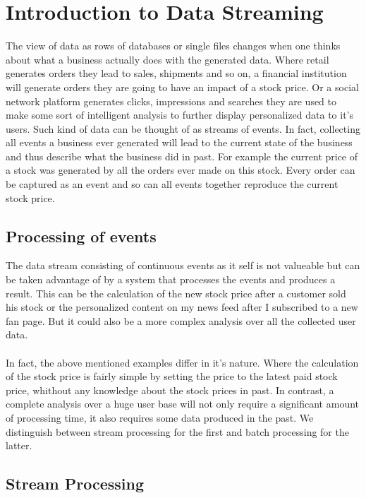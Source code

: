 \chapter{Introduction to Data Streaming}

The view of data as rows of databases or single files changes when one thinks
about what a business actually does with the generated data. Where retail
generates orders they lead to sales, shipments and so on, a financial institution will
generate orders they are going to have an impact of a stock price. Or a social
network platform generates clicks, impressions and searches they are used to
make some sort of intelligent analysis to further display personalized data to
it's users. Such kind of data can be thought of as streams of events. In fact,
collecting all events a business ever generated will lead to the current state
of the business and thus describe what the business did in past. For example the
current price of a stock was generated by all the orders ever made on this
stock. Every order can be captured as an event and so can all events together reproduce
the current stock price.

\section{Processing of events}

The data stream consisting of continuous events as it self is not valueable but
can be taken advantage of by a system that processes the events and produces a
result. This can be the calculation of the new stock price after a customer sold
his stock or the personalized content on my news feed after I subscribed to a new fan
page. But it could also be a more complex analysis over all the collected user
data.
\\ \\
In fact, the above mentioned examples differ in it's nature. Where the
calculation of the stock price is fairly simple by setting the price to the
latest paid stock price, whithout any knowledge about the stock prices in past. 
In contrast, a complete analysis over a huge user base will not only require a
significant amount of processing time, it also requires some data produced in the
past. We distinguish between stream processing for the first and batch
processing for the latter.

\section{Stream Processing}

